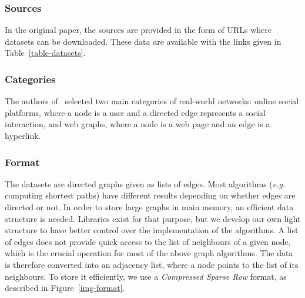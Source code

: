 \subsubsection{Sources}
In the original paper, the sources are provided in the form of URLs where datasets can be downloaded. These data are available with the links given in Table~\ref{table-datasets}.


\subsubsection{Categories}
The authors of~\cite{gorder} selected two main categories of real-world networks: online social platforms, where a node is a user and a directed edge represents a social interaction, and web graphs, where a node is a web page and an edge is a hyperlink.

\begin{table}[]
\label{table-datasets}
\end{table}

\subsubsection{Format}
The datasets are directed graphs given as lists of edges.
Most algorithms (\textit{e.g.} computing shortest paths) have different results depending on whether edges are directed or not.
%
In order to store large graphs in main memory, an efficient data structure is needed. 
%
Libraries exist for that purpose, but we develop our own light structure to have better control over the implementation of the algorithms.
%
A list of edges does not provide quick access to the list of neighbours of a given node, which is the crucial operation for most of the above graph algorithms. The data is therefore converted into an adjacency list, where a node points to the list of its neighbours. To store it efficiently, we use a \textit{Compressed Sparse Row} format, as described in Figure~\ref{img-format}.

